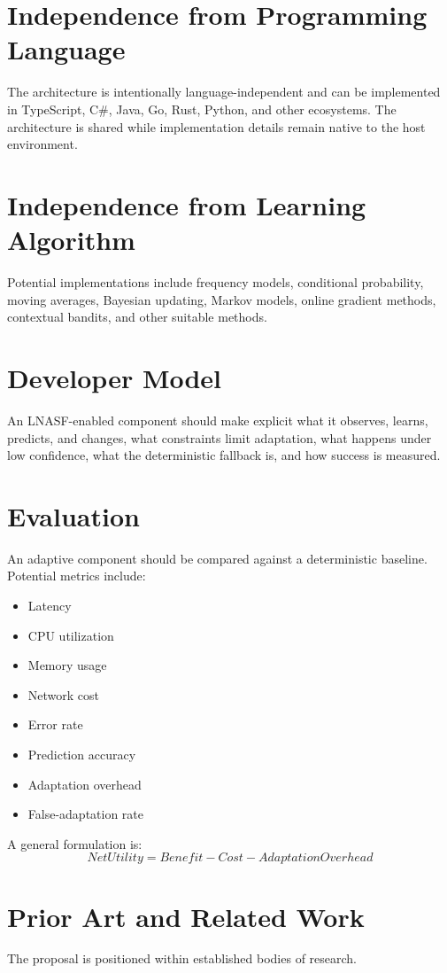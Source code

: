 \documentclass[11pt,a4paper]{article}
\begin{document}
\section{Independence from Programming Language}
The architecture is intentionally language-independent and can be implemented in TypeScript, C\#, Java, Go, Rust, Python, and other ecosystems. The architecture is shared while implementation details remain native to the host environment.

\section{Independence from Learning Algorithm}
Potential implementations include frequency models, conditional probability, moving averages, Bayesian updating, Markov models, online gradient methods, contextual bandits, and other suitable methods.

\section{Developer Model}
An LNASF-enabled component should make explicit what it observes, learns, predicts, and changes, what constraints limit adaptation, what happens under low confidence, what the deterministic fallback is, and how success is measured.

\section{Evaluation}
An adaptive component should be compared against a deterministic baseline. Potential metrics include:
\begin{itemize}
\item Latency
\item CPU utilization
\item Memory usage
\item Network cost
\item Error rate
\item Prediction accuracy
\item Adaptation overhead
\item False-adaptation rate
\end{itemize}

A general formulation is:
\[
NetUtility=Benefit-Cost-AdaptationOverhead
\]

\section{Prior Art and Related Work}
The proposal is positioned within established bodies of research.
\end{document}
